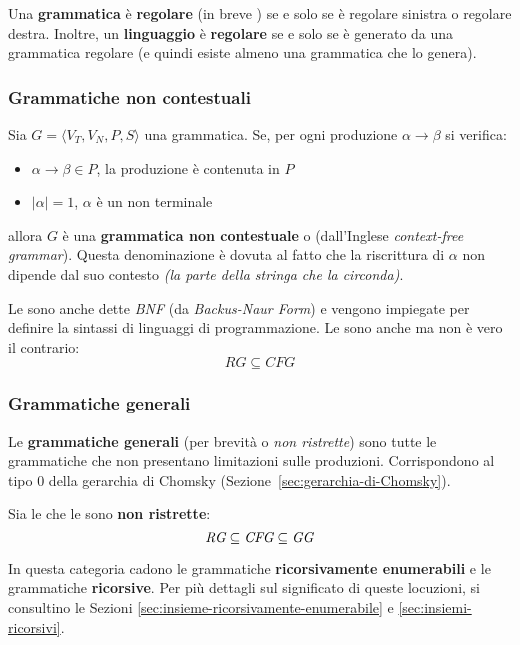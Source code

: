 \documentclass[italian, 10pt]{article}
\begin{document}
Una \textbf{grammatica} è \textbf{regolare} (in breve \RG) se e solo se è regolare sinistra o regolare destra.
Inoltre, un \textbf{linguaggio} è \textbf{regolare} se e solo se è generato da una grammatica regolare (e quindi esiste almeno una grammatica che lo genera).

\subsubsection{Grammatiche non contestuali}

Sia \(G = \langle V_T, V_N, P, S \rangle\) una grammatica.
Se, per ogni produzione \(\alpha \rightarrow \beta\) si verifica:

\begin{itemize}
  \item \(\alpha \rightarrow \beta \in P\), la produzione è contenuta in \(P\)
  \item \(|\alpha| = 1\),  \(\alpha\) è un non terminale
\end{itemize}

allora \(G\) è una \textbf{grammatica non contestuale} o \CFG (dall'Inglese \textit{context-free grammar}).
Questa denominazione è dovuta al fatto che la riscrittura di \(\alpha\) non dipende dal suo contesto \textit{(la parte della stringa che la circonda)}.

Le \CFG sono anche dette \textit{BNF} (da \textit{Backus-Naur Form}) e vengono impiegate per definire la sintassi di linguaggi di programmazione.
Le \RG sono anche \CFG ma non è vero il contrario:
\[ RG \subseteq CFG \]

\subsubsection{Grammatiche generali}

Le \textbf{grammatiche generali} (per brevità \GG o \textit{non ristrette}) sono tutte le grammatiche che non presentano limitazioni sulle produzioni.
Corrispondono al tipo \(0\) della gerarchia di Chomsky (Sezione~\ref{sec:gerarchia-di-Chomsky}).

Sia le \RG che le \CFG sono \textbf{non ristrette}:
\[ \textit{RG} \subseteq \textit{CFG} \subseteq \textit{GG} \]

\bigskip
In questa categoria cadono le grammatiche \textbf{ricorsivamente enumerabili} e le grammatiche \textbf{ricorsive}.
Per più dettagli sul significato di queste locuzioni, si consultino le Sezioni \ref{sec:insieme-ricorsivamente-enumerabile} e \ref{sec:insiemi-ricorsivi}.
\end{document}
